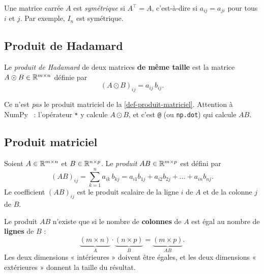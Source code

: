 \begin{definition}
Une matrice carrée $A$ est \emph{symétrique} si
$A^\top = A$, c'est-à-dire si $a_{ij} = a_{ji}$ pour
tous $i$ et $j$. Par exemple, $I_n$ est symétrique.
\end{definition}

\subsection{Produit de Hadamard}

\begin{definition}
Le \emph{produit de Hadamard} de deux matrices
\textbf{de même taille} est la matrice
$A \odot B \in \mathbb{R}^{m \times n}$ définie par
\[
    (A \odot B)_{ij} = a_{ij}\, b_{ij}.
\]
\end{definition}

\begin{importantbox}
Ce n'est \emph{pas} le produit matriciel de la
\cref{def-produit-matriciel}. Attention à
NumPy~\cite{numpy} : l'opérateur \texttt{*} y calcule
$A \odot B$, et c'est \texttt{@} (ou
\texttt{np.dot}) qui calcule $AB$.
\end{importantbox}

\subsection{Produit matriciel}

\begin{definition}
\label{def-produit-matriciel}
Soient $A \in \mathbb{R}^{m \times n}$ et
$B \in \mathbb{R}^{n \times p}$. Le \emph{produit}
$AB \in \mathbb{R}^{m \times p}$ est défini par
\[
    (AB)_{ij} = \sum_{k=1}^{n} a_{ik}\, b_{kj}
    = a_{i1} b_{1j} + a_{i2} b_{2j} + \dots + a_{in} b_{nj}.
\]
Le coefficient $(AB)_{ij}$ est le produit scalaire
de la ligne $i$ de $A$ et de la colonne $j$ de $B$.
\end{definition}

\begin{importantbox}
Le produit $AB$ n'existe que si le nombre de
\textbf{colonnes} de $A$ est égal au nombre de
\textbf{lignes} de $B$ :
\[
    \underbrace{(m \times n)}_{A}
    \cdot
    \underbrace{(n \times p)}_{B}
    = \underbrace{(m \times p)}_{AB}.
\]
Les deux dimensions « intérieures » doivent être
égales, et les deux dimensions « extérieures » donnent
la taille du résultat.
\end{importantbox}


